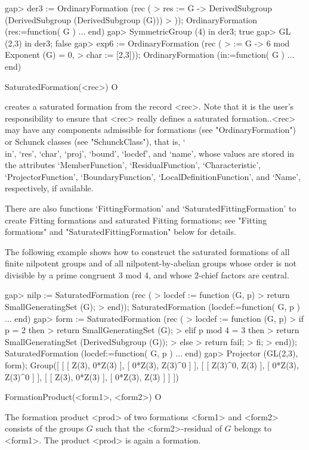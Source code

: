 \beginexample
gap> der3 := OrdinaryFormation (rec (
>    res := G -> DerivedSubgroup (DerivedSubgroup (DerivedSubgroup (G)))
> ));
OrdinaryFormation (res:=function( G ) ... end)
gap> SymmetricGroup (4) in der3;
true
gap> GL (2,3) in der3;
false
gap> exp6 := OrdinaryFormation (rec (
>    \in := G -> 6 mod Exponent (G) = 0,
>    char := [2,3]));
OrdinaryFormation (in:=function( G ) ... end)
\endexample

\>SaturatedFormation(<rec>) O

creates a saturated formation from the record <rec>. Note that it is the user's responsibility to ensure that <rec> really
defines a saturated formation..<rec> may have any
components admissible for formations (see "OrdinaryFormation") or Schunck
classes (see "SchunckClass"), that is, `\\in', `res', `char', `proj',
`bound', `locdef', and `name', 
 whose values are stored in the attributes `MemberFunction',
`ResidualFunction', `Characteristic',  `ProjectorFunction',
`BoundaryFunction', `LocalDefinitionFunction', and
`Name', respectively, if available. 

There are also functions `FittingFormation' and `SaturatedFittingFormation'
to create Fitting
formations and saturated Fitting formations; see
 "Fitting formations" and "SaturatedFittingFormation" below for details. 

The following example shows how to construct the saturated formations of
all finite nilpotent groups and of
all nilpotent-by-abelian groups whose order is not divisible by a
prime congruent 3 mod 4, and whose $2$-chief factors are central.

\beginexample
gap> nilp := SaturatedFormation (rec (
>      locdef := function (G, p)
>          return SmallGeneratingSet (G);
>      end));
SaturatedFormation (locdef:=function( G, p ) ... end)
gap> form := SaturatedFormation (rec (
>    locdef := function (G, p)
>        if p = 2 then
>           return SmallGeneratingSet (G);
>        elif p mod 4 = 3 then
>           return SmallGeneratingSet (DerivedSubgroup (G));
>        else
>           return fail;
>        fi;
>     end));
SaturatedFormation (locdef:=function( G, p ) ... end)
gap> Projector (GL(2,3), form);
Group([ [ [ Z(3), 0*Z(3) ], [ 0*Z(3), Z(3)^0 ] ], 
  [ [ Z(3)^0, Z(3) ], [ 0*Z(3), Z(3)^0 ] ], 
  [ [ Z(3), 0*Z(3) ], [ 0*Z(3), Z(3) ] ] ])
\endexample

\>FormationProduct(<form1>, <form2>) O

The formation product <prod> of two formations <form1> and <form2> 
consists  of the groups $G$ such that the <form2>-residual of $G$ belongs to
<form1>. The product <prod> is again a formation. 

